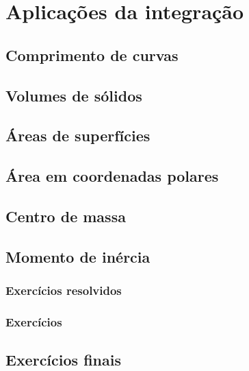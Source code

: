 
\chapter{Aplicações da integração}\label{cap:apl_integracao}

\emconstrucao

\section{Comprimento de curvas}
\construirSec


\section{Volumes de sólidos}
\construirSec

\section{Áreas de superfícies}
\construirSec

\section{Área em coordenadas polares}
\construirSec


\section{Centro de massa}
\construirSec

\section{Momento de inércia}
\construirSec

\subsection*{Exercícios resolvidos}

\construirExeresol


\subsection*{Exercícios}

\construirExer

\section{Exercícios finais}

\construirExer



